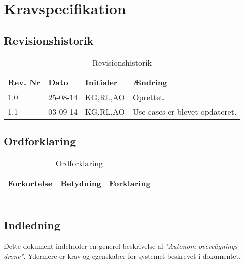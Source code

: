 \chapter{Kravspecifikation}

\section{Revisionshistorik}

\begin{table}[H]
	\centering
		\begin{tabular}{|l|l|l|p{5 cm}|} 
		\hline
			Rev. Nr & Dato		& Initialer 	& Ændring \\ \hline
			1.0 	& 25-08-14	& KG,RL,AO		& Oprettet.	\\ \hline
			1.1 	& 03-09-14	& KG,RL,AO		& Use cases er blevet opdateret.\\ \hline
		\end{tabular}
	\caption{Revisionshistorik}
\end{table}

\section{Ordforklaring}


\begin{table}[H]
	\centering
		\begin{tabular}{|p{3 cm}|p{3 cm}|p{3 cm}|} 
		\hline
			Forkortelse & Betydning & Forklaring \\ \hline
			& & \\ \hline
			& & \\ \hline
			& & \\ \hline
			& & \\ \hline
		\end{tabular}
	\caption{Ordforklaring}
\end{table}


\section{Indledning}

Dette dokument indeholder en generel beskrivelse af \textit{"Autonom overvågnings drone"}. Ydermere er krav og egenskaber for systemet beskrevet i dokumentet.